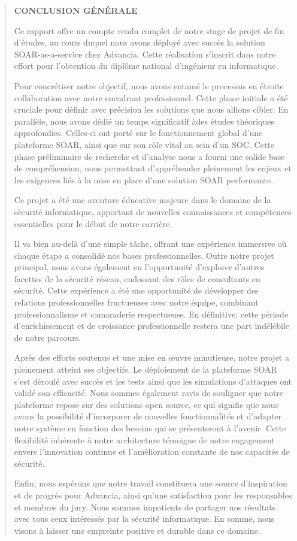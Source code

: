 \documentclass[
]{article}
\begin{document}
\begin{quote}
\textbf{CONCLUSION GÉNÉRALE}

Ce rapport offre un compte rendu complet de notre stage de projet de fin
d'études, au cours duquel nous avons déployé avec succès la solution
SOAR-as-a-service chez Advancia. Cette réalisation s'inscrit dans notre
effort pour l'obtention du diplôme national d'ingénieur en informatique.

Pour concrétiser notre objectif, nous avons entamé le processus en
étroite collaboration avec notre encadrant professionnel. Cette phase
initiale a été cruciale pour définir avec précision les solutions que
nous allions cibler. En parallèle, nous avons dédié un temps
significatif àdes études théoriques approfondies. Celles-ci ont porté
sur le fonctionnement global d'une plateforme SOAR, ainsi que sur son
rôle vital au sein d'un SOC. Cette phase préliminaire de recherche et
d'analyse nous a fourni une solide base de compréhension, nous
permettant d'appréhender pleinement les enjeux et les exigences liés à
la mise en place d'une solution SOAR performante.

Ce projet a été une aventure éducative majeure dans le domaine de la
sécurité informatique, apportant de nouvelles connaissances et
compétences essentielles pour le début de notre carrière.

Il va bien au-delà d'une simple tâche, offrant une expérience immersive
où chaque étape a consolidé nos bases professionnelles. Outre notre
projet principal, nous avons également eu l'opportunité d'explorer
d'autres facettes de la sécurité réseau, endossant des rôles de
consultants en sécurité. Cette expérience a été une opportunité de
développer des relations professionnelles fructueuses avec notre équipe,
combinant professionnalisme et camaraderie respectueuse. En définitive,
cette période d'enrichissement et de croissance professionnelle restera
une part indélébile de notre parcours.

Après des efforts soutenus et une mise en œuvre minutieuse, notre projet
a pleinement atteint ses objectifs. Le déploiement de la plateforme SOAR
s'est déroulé avec succès et les tests ainsi que les simulations
d'attaques ont validé son efficacité. Nous sommes également ravis de
souligner que notre plateforme repose sur des solutions open source, ce
qui signifie que nous avons la possibilité d'incorporer de nouvelles
fonctionnalités et d'adapter notre système en fonction des besoins qui
se présenteront à l'avenir. Cette flexibilité inhérente à notre
architecture témoigne de notre engagement envers l'innovation continue
et l'amélioration constante de nos capacités de sécurité.

Enfin, nous espérons que notre travail constituera une source
d'inspiration et de progrès pour Advancia, ainsi qu'une satisfaction
pour les responsables et membres du jury. Nous sommes impatients de
partager nos résultats avec tous ceux intéressés par la sécurité
informatique. En somme, nous visons à laisser une empreinte positive et
durable dans ce domaine.
\end{quote}
\end{document}
